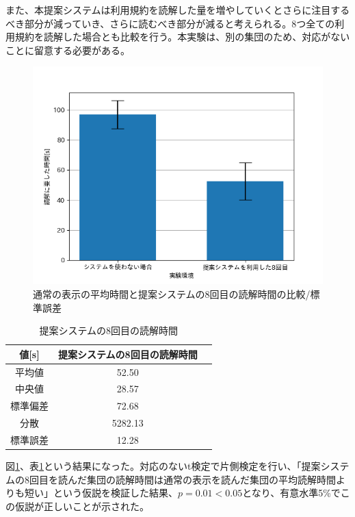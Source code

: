 また、本提案システムは利用規約を読解した量を増やしていくとさらに注目するべき部分が減っていき、さらに読むべき部分が減ると考えられる。8つ全ての利用規約を読解した場合とも比較を行う。本実験は、別の集団のため、対応がないことに留意する必要がある。
\begin{figure}[h]
  \begin{center}
      \includegraphics[width=13cm]{img/tgraph8.png}
      \caption{通常の表示の平均時間と提案システムの8回目の読解時間の比較/標準誤差}
      \label{img:通常の表示の平均時間と提案システムの8回目の読解時間の比較/標準誤差}
  \end{center}
\end{figure}
\begin{table}[h]
  \caption{提案システムの8回目の読解時間}
  \label{tab:提案システムの8回目の読解時間}
  \centering
  \begin{tabular}{ccc}
    \hline
    値[s]  & 提案システムの8回目の読解時間  \\
    \hline \hline
    平均値  & 52.50 \\
    中央値  & 28.57 \\
    標準偏差  & 72.68 \\
    分散  &  5282.13 \\
    標準誤差  & 12.28 \\
    \hline
  \end{tabular}
\end{table}
図\ref{img:通常の表示の平均時間と提案システムの8回目の読解時間の比較/標準誤差}、表\ref{tab:提案システムの8回目の読解時間}という結果になった。対応のないt検定で片側検定を行い、「提案システムの8回目を読んだ集団の読解時間は通常の表示を読んだ集団の平均読解時間よりも短い」という仮説を検証した結果、$p=0.01<0.05$となり、有意水準5\%でこの仮説が正しいことが示された。

